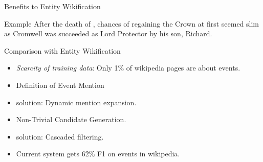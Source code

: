 \begin{frame}{Benefits to Entity Wikification}
  \begin{block}{Example}
    After the { death of },  chances of regaining the Crown at first seemed slim as Cromwell was succeeded as Lord Protector by his son, Richard.
  \end{block}
\end{frame}

\begin{frame}{Comparison with Entity Wikification}
  \begin{itemize}[<+->]
  \item \emph{Scarcity of training data}: Only 1\% of wikipedia pages are about events.
  \item Definition of Event Mention
  \item {\color{red}solution:} Dynamic mention expansion.
  \item Non-Trivial Candidate Generation.
  \item {\color{red}solution:} Cascaded filtering.
  \item Current system gets 62\% F1 on events in wikipedia.
  \end{itemize}
\end{frame}






